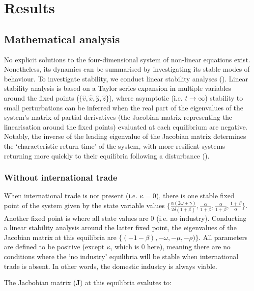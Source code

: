 \documentclass[12pt]{article}
\begin{document}
\section{Results}

\subsection{Mathematical analysis}
No explicit solutions to the four-dimensional system of non-linear equations exist. Nonetheless, its dynamics can be summarised by investigating its stable modes of behaviour. To investigate stability, we conduct linear stability analyses (\cite{strogatz1994}). Linear stability analysis is based on a Taylor series expansion in multiple variables around the fixed points ($\{\hat{v}, \hat{x}, \hat{y}, \hat{z}\}$), where asymptotic (i.e. $t \rightarrow \infty$) stability to small perturbations can be inferred when the real part of the eigenvalues of the system's matrix of partial derivatives (the Jacobian matrix representing the linearisation around the fixed points) evaluated at each equilibrium are negative. Notably, the inverse of the leading eigenvalue of the Jacobian matrix determines the `characteristic return time' of the system, with more resilient systems returning more quickly to their equilibria following a disturbance (\cite{pimm1984}).

\subsubsection{Without international trade}
When international trade is not present (i.e. $\kappa = 0$), there is one stable fixed point of the system given by the state variable values $\big \{\frac{\alpha(2\omega + \gamma)}{2 \delta (1 + \beta)}, \frac{\alpha}{1 + \beta}, \frac{\alpha}{1 + \beta}, \frac{1 + \beta}{\alpha}\big\}$. Another fixed point is where all state values are 0 (i.e. no industry). Conducting a linear stability analysis around the latter fixed point, the eigenvalues of the Jacobian matrix at this equilibria are $\{(-1 - \beta), - \omega, - \mu, - \rho)\}$. All parameters are defined to be positive (except $\kappa$, which is $0$ here), meaning there are no conditions where the `no industry' equilibria will be stable when international trade is absent. In other words, the domestic industry is always viable.

\iffalse
The Jacbobian matrix ($\boldsymbol{J}$) at this equilibria evalutes to:
\end{document}
